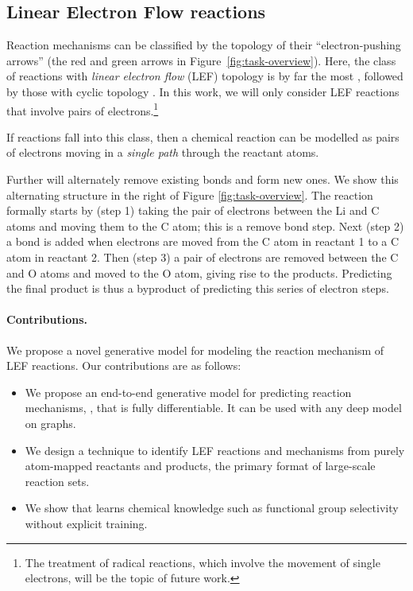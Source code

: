 \subsection{Linear Electron Flow reactions} \label{sect:LEF}
%

Reaction mechanisms can be classified by the topology of their ``electron-pushing arrows'' (the red and green arrows in Figure~\ref{fig:task-overview}). 
Here, the class of reactions with \emph{linear electron flow} (LEF) topology is by far the most , followed by those with cyclic topology \citep{herges1994coarctate}. 
In this work, we will only consider LEF reactions that involve pairs of electrons.\footnote{The treatment of radical reactions, which involve the movement of single electrons, will be the topic of future work.}

If reactions fall into this class, then a chemical reaction can be modelled as pairs of electrons moving in a \emph{single path} through the reactant atoms. 

Further  will alternately remove existing bonds and form new ones. 
We show this alternating structure in the right of Figure \ref{fig:task-overview}. 
The reaction formally starts by (step 1) taking the pair of electrons between the Li and C atoms and moving them to the C atom; this is a remove bond step. 
Next (step 2) a bond is added when electrons are moved from the C atom in reactant 1 to a C atom in reactant 2.
Then (step 3) a pair of electrons are removed between the C and O atoms and moved to the O atom, giving rise to the products. 
Predicting the final product is thus a byproduct of predicting this series of electron steps.


\paragraph{Contributions.} We propose a novel generative model for modeling the reaction mechanism of LEF reactions. Our contributions are as follows:
\begin{itemize}
\item We propose an end-to-end generative model for predicting reaction mechanisms, \ourModelR, that is fully differentiable. It can be used with any deep model on graphs.
\item We design a technique to identify LEF reactions and mechanisms from purely atom-mapped reactants and products, the primary format of large-scale reaction sets.
\item We show that \ourModelR learns chemical knowledge such as functional group selectivity without explicit training.
\end{itemize}


